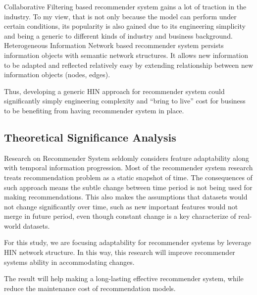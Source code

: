 \documentclass[12pt,a4 paper,title page]{article}
\theoremstyle{definition}
\begin{document}
Collaborative Filtering based recommender system gains a lot of traction in the industry. To my view, that is not only because the model can perform under certain conditions, its popularity is also gained due to its engineering simplicity and being a generic to different kinds of industry and business background. Heterogeneous Information Network based recommender system persists information objects with semantic network structures. It allows new information to be adapted and reflected relatively easy by extending relationship between new information objects (nodes, edges).  

Thus, developing a generic HIN approach for recommender system could significantly simply engineering complexity and “bring to live” cost for business to be benefiting from having recommender system in place. 

\subsection{Theoretical Significance Analysis}
Research on Recommender System seldomly considers feature adaptability along with temporal information progression. Most of the recommender system research treats recommendation problem as a static snapshot of time. The consequences of such approach means the subtle change between time period is not being used for making recommendations. This also makes the assumptions that datasets would not change significantly over time, such as new important features would not merge in future period, even though constant change is a key characterize of real-world datasets. 

For this study, we are focusing adaptability for recommender systems by leverage HIN network structure.  In this way, this research will improve recommender systems ability in accommodating changes. 

The result will help making a long-lasting effective recommender system, while reduce the maintenance cost of recommendation models. 

\clearpage


\end{document}
